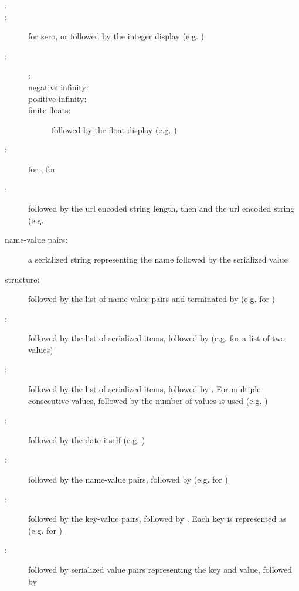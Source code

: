 \begin{description}
	\item[:] 
	\item[:]  for zero, or  followed by the integer display (e.g. )
	\item[:] \mbox{}
		\begin{description}
			\item[:] 
			\item[negative infinity:] 
			\item[positive infinity:] 
			\item[finite floats:]  followed by the float display (e.g. )
		\end{description}
	\item[:]  for ,  for 
	\item[:]  followed by the url encoded string length, then \expr{:} and the url encoded string (e.g. 
	\item[name-value pairs:] a serialized string representing the name followed by the serialized value
	\item[structure:]  followed by the list of name-value pairs and terminated by  (e.g.  for )
	\item[:]  followed by the list of serialized items, followed by  (e.g.  for a list of two  values)
	\item[:]  followed by the list of serialized items, followed by . For multiple consecutive  values,  followed by the number of  values is used (e.g. )
	\item[:]  followed by the date itself (e.g. )
	\item[:]  followed by the name-value pairs, followed by  (e.g.  for )
	\item[:]  followed by the key-value pairs, followed by . Each key is represented as  (e.g.  for )
	\item[:]  followed by serialized value pairs representing the key and value, followed by 

\end{description}
